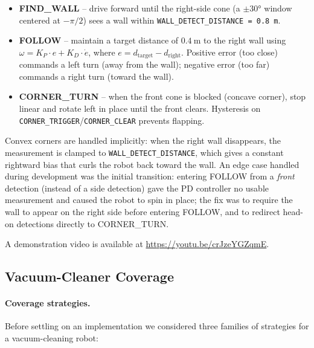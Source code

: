 \documentclass[12pt, a4paper]{article}
\begin{document}
\begin{itemize}
    \item \textbf{FIND\_WALL} -- drive forward until the right-side cone (a
          $\pm30°$ window centered at $-\pi/2$) sees a wall within
          \texttt{WALL\_DETECT\_DISTANCE = 0.8~m}.
    \item \textbf{FOLLOW} -- maintain a target distance of $0.4~$m to the right
          wall using $\omega = K_P \cdot e + K_D \cdot \dot e$, where
          $e = d_{\mathrm{target}} - d_{\mathrm{right}}$.  Positive error
          (too close) commands a left turn (away from the wall); negative
          error (too far) commands a right turn (toward the wall).
    \item \textbf{CORNER\_TURN} -- when the front cone is blocked (concave
          corner), stop linear and rotate left in place until the front
          clears.  Hysteresis on \texttt{CORNER\_TRIGGER}/\texttt{CORNER\_CLEAR}
          prevents flapping.
\end{itemize}

Convex corners are handled implicitly: when the right wall disappears, the
measurement is clamped to \texttt{WALL\_DETECT\_DISTANCE}, which gives a
constant rightward bias that curls the robot back toward the wall.  An edge
case handled during development was the initial transition: entering FOLLOW
from a \emph{front} detection (instead of a side detection) gave the PD
controller no usable measurement and caused the robot to spin in place; the
fix was to require the wall to appear on the right side before entering
FOLLOW, and to redirect head-on detections directly to CORNER\_TURN.

A demonstration video is available at
\url{https://youtu.be/crJzeYGZqmE}.

\subsection{Vacuum-Cleaner Coverage}

\paragraph{Coverage strategies.}
Before settling on an implementation we considered three families of strategies
for a vacuum-cleaning robot:
\end{document}
